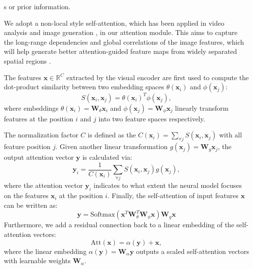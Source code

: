 \documentclass[letterpaper]{article}
\begin{document}
s or prior information.

We adopt a non-local style self-attention, which has been applied in video analysis \cite{wang2018non} and image generation \cite{zhang2018self}, in our attention module. This aims to capture the long-range dependencies and global correlations of the image features, which will help generate better attention-guided feature maps from widely separated spatial regions \cite{wang2018non}.





The features $\mathbf{x} \in \mathbb{R}^{C}$ extracted by the visual encoder are first used to compute the dot-product similarity between two embedding spaces $\theta(\mathbf{x}_i)$ and $\phi(\mathbf{x}_j)$:
    \begin{equation}
	    S(\mathbf{x}_i, \mathbf{x}_j) = \theta(\mathbf{x}_i)^T\phi(\mathbf{x}_j),
	    \label{eq:similarity}
    \end{equation}
where embeddings $\theta(\mathbf{x}_i)=\mathbf{W}_\theta \mathbf{x}_i$ and $\phi(\mathbf{x}_j)=\mathbf{W}_\phi \mathbf{x}_j$ linearly transform features at the position $i$ and $j$ into two feature spaces respectively. 

The normalization factor $C$ is defined as the $C(\mathbf{x}_i)= \sum_{\forall j} S(\mathbf{x}_i, \mathbf{x}_j)$ with all feature position $j$.
Given another linear transformation $g(\mathbf{x}_j)=\mathbf{W}_g \mathbf{x}_j$, the output attention vector $\mathbf{y}$ is calculated via:
    \begin{equation}
        \mathbf{y}_i = \frac{1}{C(\mathbf{x}_i)} \sum_{\forall j} S(\mathbf{x}_i, \mathbf{x}_j) g(\mathbf{x}_j) ,
    \end{equation}
where the attention vector $\mathbf{y}_i$ indicates to what extent the neural model focuses on the features $\mathbf{x}_i$ at the position $i$. Finally, the self-attention of input features $\mathbf{x}$ can be written as: 
\begin{equation}
	\mathbf{y} = \text{Softmax}(\mathbf{x}^T \mathbf{W}^T_\theta \mathbf{W}_\phi \mathbf{x}) \mathbf{W}_g \mathbf{x}
	\label{eq:attentionmap}
\end{equation}
Furthermore, we add a residual connection back to a linear embedding of the self-attention vectors:
\begin{equation}
	\text{Att}(\mathbf{x}) = \alpha(\mathbf{y}) + \mathbf{x},
	\label{eq:attoutput}
\end{equation}
where the linear embedding $\alpha(\mathbf{y})=\mathbf{W}_\alpha \mathbf{y}$ outputs a scaled self-attention vectors with learnable weights $\mathbf{W}_\alpha$.
\end{document}
